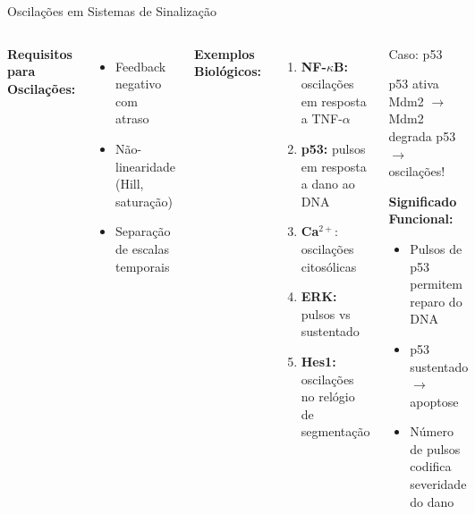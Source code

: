 \begin{frame}{Oscilações em Sistemas de Sinalização}
\begin{columns}
\textbf{Requisitos para Oscilações:}
\begin{itemize}
    \item Feedback negativo com atraso
    \item Não-linearidade (Hill, saturação)
    \item Separação de escalas temporais
\end{itemize}

\vspace{0.3cm}

\textbf{Exemplos Biológicos:}
\begin{enumerate}
    \item \textbf{NF-$\kappa$B:} oscilações em resposta a TNF-$\alpha$
    \item \textbf{p53:} pulsos em resposta a dano ao DNA
    \item \textbf{Ca}$^{2+}$: oscilações citosólicas
    \item \textbf{ERK:} pulsos vs sustentado
    \item \textbf{Hes1:} oscilações no relógio de segmentação
\end{enumerate}

\begin{exampleblock}{Caso: p53}
\begin{center}
\end{center}

\vspace{0.2cm}

p53 ativa Mdm2 $\rightarrow$ Mdm2 degrada p53 $\rightarrow$ oscilações!

\vspace{0.3cm}

\textbf{Significado Funcional:}
\begin{itemize}
    \item Pulsos de p53 permitem reparo do DNA
    \item p53 sustentado $\rightarrow$ apoptose
    \item Número de pulsos codifica severidade do dano
\end{itemize}
\end{exampleblock}
\end{columns}
\end{frame}

